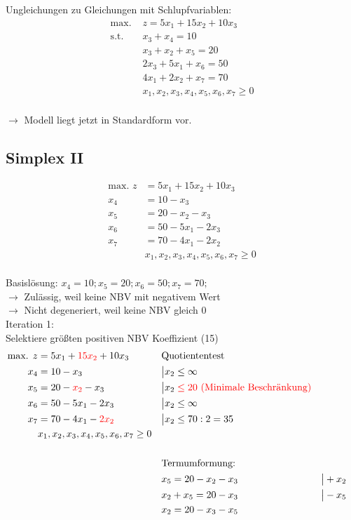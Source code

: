 \documentclass[a4paper,11pt]{article}
\begin{document}
\vspace{4mm}
    
Ungleichungen zu Gleichungen mit Schlupfvariablen:
\begin{align*}
    \text{max. } & z = 5x_{1} + 15x_{2} + 10x_{3} \\
    \text{s.t. } & x_{3} + x_{4} = 10 \\
    & x_{3} + x_{2} + x_{5} = 20 \\
    & 2x_{3} + 5x_{1} + x_{6} = 50 \\
    & 4x_{1} + 2x_{2} + x_{7} = 70 \\
    & x_{1}, x_{2}, x_{3}, x_{4}, x_{5}, x_{6}, x_{7} \ge 0 \\
\end{align*}

$\to$ Modell liegt jetzt in Standardform vor.

\subsection*{Simplex II}
\begin{align*}
    \text{max. } z &= 5x_{1} + 15x_{2} + 10x_{3} \\
    x_{4} &= 10 - x_{3} \\
    x_{5} &= 20 - x_{2} - x_{3} \\
    x_{6} &= 50 - 5x_{1} - 2x_{3} \\
    x_{7} &= 70 - 4x_{1} - 2x_{2} \\
    & x_{1}, x_{2}, x_{3}, x_{4}, x_{5}, x_{6}, x_{7} \ge 0 \\
\end{align*}

Basislösung: $x_{4}=10; x_{5}=20; x_{6}=50; x_{7}=70;$ \\
$\to$ Zulässig, weil keine NBV mit negativem Wert \\
$\to$ Nicht degeneriert, weil keine NBV gleich 0 \\

Iteration 1: \\
{\color{red} Selektiere größten positiven NBV Koeffizient (15)}
\begin{align*}
    \text{max. } z &= 5x_{1} + {\color{red}15x_{2}} + 10x_{3} && \text{Quotiententest} \\
    x_{4} &= 10 - x_{3} && \big| x_{2} \le \infty \\
    x_{5} &= 20 - {\color{red}x_{2}} - x_{3} && \big| x_{2} \color{red} \le 20  \text{ (Minimale Beschränkung)} \\
    x_{6} &= 50 - 5x_{1} - 2x_{3} && \big| x_{2} \le \infty \\
    x_{7} &= 70 - 4x_{1} - {\color{red}2x_{2}} && \big| x_{2} \le 70:2=35 \\
    & x_{1}, x_{2}, x_{3}, x_{4}, x_{5}, x_{6}, x_{7} \ge 0 \\
    \\
    &&& \text{Termumformung:} \\
    &&& x_{5}= 20 -x_{2} -x_{3} &&\big| + x_{2} \\
    &&& x_{2} + x_{5}= 20 -x_{3} &&\big| - x_{5} \\
    &&& x_{2} = 20 -x_{3} - x_{5}
\end{align*}
\end{document}
